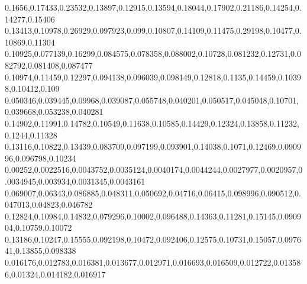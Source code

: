 0.1656,0.17433,0.23532,0.13897,0.12915,0.13594,0.18044,0.17902,0.21186,0.14254,0.14277,0.15406
0.13413,0.10978,0.26929,0.097923,0.099,0.10807,0.14109,0.11475,0.29198,0.10477,0.10869,0.11304
0.10925,0.077139,0.16299,0.084575,0.078358,0.088002,0.10728,0.081232,0.12731,0.082792,0.081408,0.087477
0.10974,0.11459,0.12297,0.094138,0.096039,0.098149,0.12818,0.1135,0.14459,0.10398,0.10412,0.109
0.050346,0.039445,0.09968,0.039087,0.055748,0.040201,0.050517,0.045048,0.10701,0.039668,0.053238,0.040281
0.14902,0.11991,0.14782,0.10549,0.11638,0.10585,0.14429,0.12324,0.13858,0.11232,0.1244,0.11328
0.13116,0.10822,0.13439,0.083709,0.097199,0.093901,0.14038,0.1071,0.12469,0.090996,0.096798,0.10234
0.00252,0.0022516,0.0043752,0.0035124,0.0040174,0.0044244,0.0027977,0.0020957,0.0034945,0.003934,0.0031345,0.0043161
0.069007,0.06343,0.086885,0.048311,0.050692,0.04716,0.06415,0.098996,0.090512,0.047013,0.04823,0.046782
0.12824,0.10984,0.14832,0.079296,0.10002,0.096488,0.14363,0.11281,0.15145,0.090904,0.10759,0.10072
0.13186,0.10247,0.15555,0.092198,0.10472,0.092406,0.12575,0.10731,0.15057,0.097641,0.13855,0.098338
0.016176,0.012783,0.016381,0.013677,0.012971,0.016693,0.016509,0.012722,0.013586,0.01324,0.014182,0.016917
